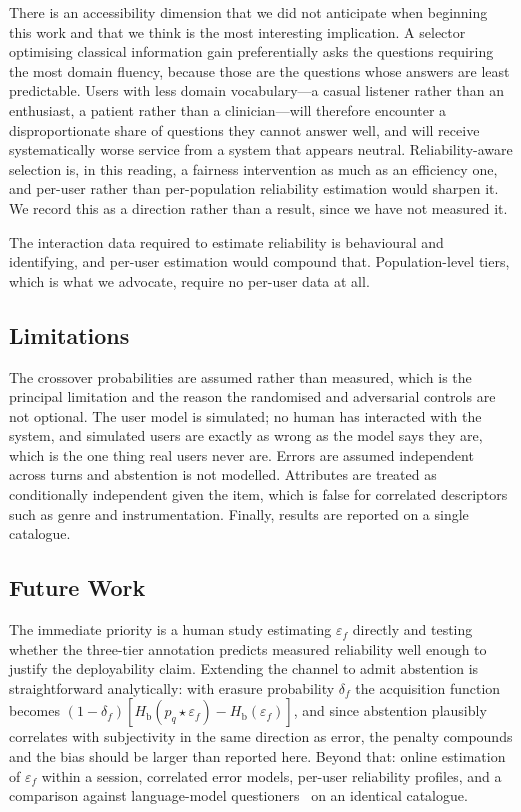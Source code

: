 \documentclass[conference]{IEEEtran}
\newcommand{\Hb}{H_{\mathrm{b}}}
\begin{document}
There is an accessibility dimension that we did not anticipate when beginning
this work and that we think is the most interesting implication. A selector
optimising classical information gain preferentially asks the questions
requiring the most domain fluency, because those are the questions whose
answers are least predictable. Users with less domain vocabulary---a casual
listener rather than an enthusiast, a patient rather than a clinician---will
therefore encounter a disproportionate share of questions they cannot answer
well, and will receive systematically worse service from a system that appears
neutral. Reliability-aware selection is, in this reading, a fairness
intervention as much as an efficiency one, and per-user rather than
per-population reliability estimation would sharpen it. We record this as a
direction rather than a result, since we have not measured it.

The interaction data required to estimate reliability is behavioural and
identifying, and per-user estimation would compound that. Population-level
tiers, which is what we advocate, require no per-user data at all.

\subsection{Limitations}
\label{sec:limitations}

The crossover probabilities are assumed rather than measured, which is the
principal limitation and the reason the randomised and adversarial controls are
not optional. The user model is simulated; no human has interacted with the
system, and simulated users are exactly as wrong as the model says they are,
which is the one thing real users never are. Errors are assumed independent
across turns and abstention is not modelled. Attributes are treated as
conditionally independent given the item, which is false for correlated
descriptors such as genre and instrumentation. Finally, results are reported on
a single catalogue.

\subsection{Future Work}

The immediate priority is a human study estimating $\varepsilon_f$ directly and
testing whether the three-tier annotation predicts measured reliability well
enough to justify the deployability claim. Extending the channel to admit
abstention is straightforward analytically: with erasure probability $\delta_f$
the acquisition function becomes
$(1-\delta_f)\left[\Hb(p_q \star \varepsilon_f) - \Hb(\varepsilon_f)\right]$,
and since abstention plausibly correlates with subjectivity in the same
direction as error, the penalty compounds and the bias should be larger than
reported here. Beyond that: online estimation of $\varepsilon_f$ within a
session, correlated error models, per-user reliability profiles, and a
comparison against language-model questioners~\cite{hu2024uot,mazzaccara2024}
on an identical catalogue.
\end{document}
